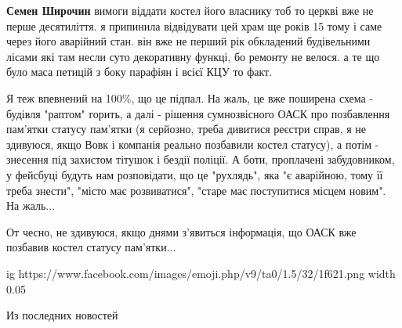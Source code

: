 \begin{itemize}
\begin{itemize}
 
\textbf{Семен Широчин} вимоги віддати костел його власнику тоб то церкві вже не перше десятиліття. я припинила відвідувати цей храм ще років 15 тому і саме через його аварійний стан. він вже не перший рік обкладений будівельними лісами які там несли суто декоративну функці, бо ремонту не велося. а те що було маса петицій з боку парафіян і всієї КЦУ то факт.
\end{itemize}

 

Я теж впевнений на 100\%, що це підпал. На жаль, це вже поширена схема - будівля
"раптом" горить, а далі - рішення сумнозвісного ОАСК про позбавлення пам'ятки
статусу пам'ятки (я серйозно, треба дивитися реєстри справ, я не здивуюся, якщо
Вовк і компанія реально позбавили костел статусу), а потім - знесення під
захистом тітушок і бездії поліції. А боти, проплачені забудовником, у фейсбуці
будуть нам розповідати, що це "рухлядь", яка "є аварійною, тому її треба
знести", "місто має розвиватися", "старе має поступитися місцем новим". На
жаль...

От чесно, не здивуюся, якщо днями з'явиться інформація, що ОАСК вже позбавив
костел статусу пам'ятки...

 

\ifcmt
  ig https://www.facebook.com/images/emoji.php/v9/ta0/1.5/32/1f621.png
  width 0.05
\fi


 
Из последних новостей


\end{itemize}
